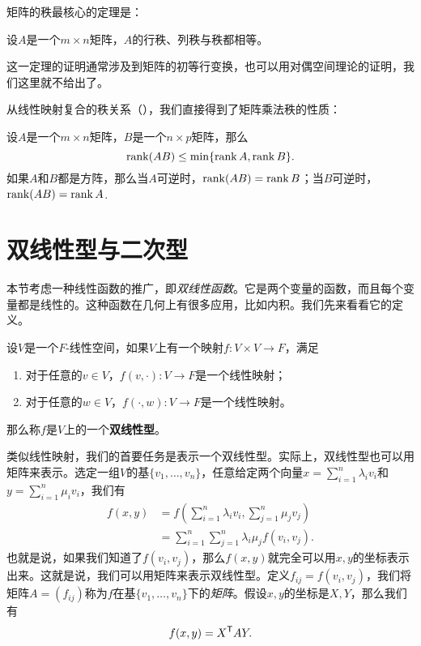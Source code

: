 矩阵的秩最核心的定理是：

\begin{theorem}\label{thm:rank}
    设$A$是一个$m\times n$矩阵，$A$的行秩、列秩与秩都相等。
\end{theorem}
这一定理的证明通常涉及到矩阵的初等行变换，也可以用对偶空间理论的证明，我们这里就不给出了。

从线性映射复合的秩关系（），我们直接得到了矩阵乘法秩的性质：

\begin{proposition}\label{prop:rank-multiplication}
    设$A$是一个$m\times n$矩阵，$B$是一个$n\times p$矩阵，那么
    \[\operatorname*{rank}(AB)\leq \min\{\operatorname*{rank} A,\operatorname*{rank} B\}.\]
如果$A$和$B$都是方阵，那么当$A$可逆时，$\operatorname*{rank}(AB)=\operatorname*{rank} B$；当$B$可逆时，$\operatorname*{rank}(AB)=\operatorname*{rank} A$.
\end{proposition}

\section{双线性型与二次型}

本节考虑一种线性函数的推广，即\emph{双线性函数}。它是两个变量的函数，而且每个变量都是线性的。这种函数在几何上有很多应用，比如内积。我们先来看看它的定义。

\begin{definition}[双线性型]\label{def:bilinear-form}
    设$V$是一个$F$-线性空间，如果$V$上有一个映射$f:V\times V\to F$，满足
    \begin{enumerate}
        \item 对于任意的$v\in V$，$f(v,\cdot):V\to F$是一个线性映射；
        \item 对于任意的$w\in V$，$f(\cdot,w):V\to F$是一个线性映射。
    \end{enumerate}
    那么称$f$是$V$上的一个\textbf{双线性型}。
\end{definition}

类似线性映射，我们的首要任务是表示一个双线性型。实际上，双线性型也可以用矩阵来表示。选定一组$V$的基$\{v_1,\dots,v_n\}$，任意给定两个向量$x=\sum_{i=1}^n\lambda_iv_i$和$y=\sum_{i=1}^n\mu_iv_i$，我们有
\begin{align*}
    f(x,y)&=f\left(\sum_{i=1}^n\lambda_iv_i,\sum_{j=1}^n\mu_jv_j\right)\\
    &=\sum_{i=1}^n\sum_{j=1}^n\lambda_i\mu_jf(v_i,v_j).
\end{align*}
也就是说，如果我们知道了$f(v_i,v_j)$，那么$f(x,y)$就完全可以用$x,y$的坐标表示出来。这就是说，我们可以用矩阵来表示双线性型。定义$f_{ij}=f(v_i,v_j)$，我们将矩阵$A=(f_{ij})$称为$f$在基$\{v_1,\dots,v_n\}$下的\emph{矩阵}。假设$x,y$的坐标是$X,Y$，那么我们有
\[
    f(x,y)=X^{\mathsf{T}} AY.
\]

